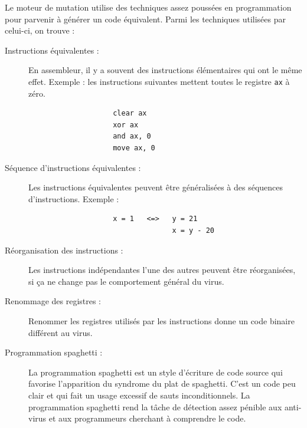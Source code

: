         Le moteur de mutation utilise des techniques assez poussées en programmation pour 
        parvenir à générer un code équivalent. Parmi les techniques utilisées par celui-ci, on trouve : %
        \cite{virus}
        \begin{description}
            \item[Instructions équivalentes :] En assembleur, il y a souvent des instructions élémentaires qui ont 
                le même effet. Exemple : les instructions suivantes mettent toutes le registre \verb|ax| à zéro. %
                \begin{verbatim}
                    clear ax
                    xor ax
                    and ax, 0
                    move ax, 0
                \end{verbatim}

            \item[Séquence d'instructions équivalentes :] Les instructions équivalentes peuvent être généralisées à
                des séquences d'instructions. Exemple : %
                \begin{verbatim}
                    x = 1   <=>   y = 21
                                  x = y - 20
                \end{verbatim}
            \item[Réorganisation des instructions :] Les instructions indépendantes l'une des autres peuvent 
                être réorganisées, si ça ne change pas le comportement général du virus.

            \item[Renommage des registres :] Renommer les registres utilisés par les instructions donne un code binaire
                différent au virus. %

            \item[Programmation spaghetti :] La programmation spaghetti est un style d'écriture de code source qui
                favorise l'apparition du syndrome du plat de spaghetti. C'est un code peu clair et qui fait un 
                usage excessif de sauts inconditionnels. La programmation spaghetti rend la tâche de détection 
                assez pénible aux anti-virus et aux programmeurs cherchant à comprendre le code. %


\end{description}
